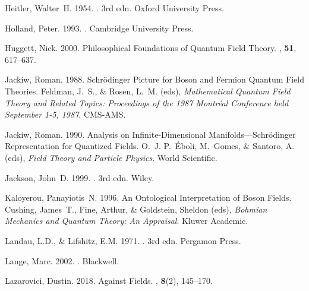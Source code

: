 \documentclass[12pt,secnumarabic,amsmath,amssymb,balancelastpage,nofootinbib]{article}
\begin{document}
\begin{thebibliography}{}
Heitler, Walter~H. 1954.
. 3rd edn.
\newblock Oxford University Press.

Holland, Peter. 1993.
.
\newblock Cambridge University Press.

Huggett, Nick. 2000.
\newblock Philosophical Foundations of Quantum Field Theory.
, {\bf 51},
  617--637.

Jackiw, Roman. 1988.
\newblock Schr\"{o}dinger Picture for Boson and Fermion Quantum Field Theories.
 Feldman, J.~S., \& Rosen, L.~M. (eds), {\em
  Mathematical Quantum Field Theory and Related Topics: Proceedings of the 1987
  Montr\'{e}al Conference held September 1-5, 1987}.
\newblock CMS-AMS.

Jackiw, Roman. 1990.
\newblock Analysis on Infinite-Dimensional Manifolds---Schr\"{o}dinger
  Representation for Quantized Fields.
 O.~J. P.~\'{E}boli, M.~Gomes, \& Santoro, A.
  (eds), {\em Field Theory and Particle Physics}.
\newblock World Scientific.

Jackson, John~D. 1999.
. 3rd edn.
\newblock Wiley.

Kaloyerou, Panayiotis~N. 1996.
\newblock An Ontological Interpretation of Boson Fields.
 Cushing, James~T., Fine, Arthur, \&
  Goldstein, Sheldon (eds), {\em Bohmian Mechanics and Quantum Theory: An
  Appraisal}.
\newblock Kluwer Academic.

Landau, L.D., \& Lifshitz, E.M. 1971.
. 3rd edn.
\newblock Pergamon Press.

Lange, Marc. 2002.
.
\newblock Blackwell.

Lazarovici, Dustin. 2018.
\newblock Against Fields.
, {\bf 8}(2),
  145--170.


\end{thebibliography}
\end{document}
